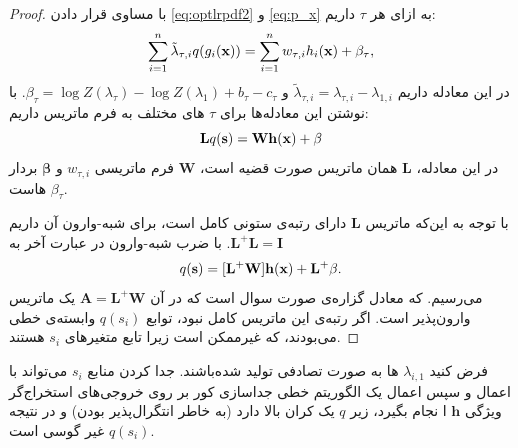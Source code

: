 \documentclass[oneside]{thesis}
\begin{document}
\begin{proof}
	با مساوی قرار دادن 
	\eqref{eq:optlrpdf2}
	و
	\eqref{eq:p_x}
	به ازای هر 
	$\tau$
	داریم:
	\begin{equation}
	\sum_{i=1}^n \tilde{\lambda}_{\tau,i} q(g_i(\mathbf{x})) 
	= \sum_{i=1}^n w_{\tau,i} h_i(\mathbf{x}) + \beta_\tau,
	\label{eq:maineq}
	\end{equation}
	در این معادله داریم
	$\tilde{\lambda}_{\tau,i}= \lambda_{\tau,i}- \lambda_{1,i}$ 
	و
	$\beta_\tau= \log Z(\lambda_\tau)-\log Z(\lambda_1)+b_\tau-c_\tau$.
	با نوشتن این معادله‌ها برای 
	$\tau$
	های مختلف  به فرم ماتریس داریم:
	\begin{equation}
	\mathbf{ L} q(\s) %
	= \mathbf{W} \h(\x) + \mathbf{\beta}
	\end{equation}
	در این معادله،
	$\mathbf{ L}$
	همان ماتریس صورت قضیه است،
	$\mathbf{ W}$
	فرم ماتریسی
	$w_{\tau, i}$
	و
	$\mathbf{\beta}$
	بردار 
	$\beta_\tau$
	هاست.
	
	با توجه به این‌که ماتریس
	$\mathbf{ L}$
	دارای رتبه‌ی ستونی کامل است، برای شبه-وارون آن داریم
	$\mathbf{L}^+\mathbf{L} = \mathbf{I}$. 
	با ضرب شبه-وارون در عبارت آخر به 
	\begin{equation}
	q(\mathbf{s})
	= [\mathbf{L}^+  \mathbf{W}] \mathbf{h}(\mathbf{x}) + \mathbf{L}^+ \beta.
	\end{equation}
	می‌رسیم. که معادل گزاره‌ی صورت سوال است که در آن 
	$\mathbf{A} = \mathbf{L}^+  \mathbf{W}$
	یک ماتریس وارون‌پذیر است. اگر رتبه‌ی این ماتریس کامل نبود، توابع 
	$q(s_i)$
	وابسته‌ی خطی می‌بودند، که غیرممکن است زیرا تابع متغیر‌های 
	$s_i$
	هستند.
\end{proof}

\begin{corollary}
	فرض‌ کنید
	$\lambda_{i, 1}$
	ها به صورت تصادفی تولید شده‌باشند. جدا کردن منابع 
	$s_i$
	می‌تواند با اعمال 
	و سپس اعمال یک الگوریتم خطی جداسازی کور بر روی خروجی‌های استخراج‌گر ویژگی
	$\mathbf{h}$
	ا نجام بگیرد، زیر $q$ یک کران بالا دارد (به خاطر انتگرال‌پذیر بودن) و در نتیجه 
	$q(s_i)$
	غیر گوسی است.
	\label{corr}
\end{corollary}
\end{document}
